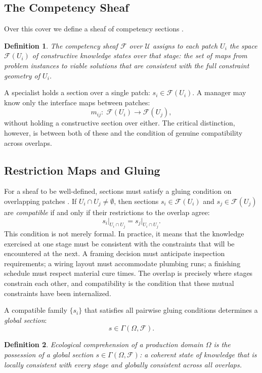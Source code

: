 \documentclass[12pt]{article}
\newtheorem{definition}{Definition}
\begin{document}
\subsection{The Competency Sheaf}

Over this cover we define a sheaf of competency sections \cite{Bredon1997,KashiwaraSchapira2006}.

\begin{definition}
The \emph{competency sheaf} $\mathcal{F}$ over $\mathcal{U}$ assigns to each patch $U_i$ the space $\mathcal{F}(U_i)$ of constructive knowledge states over that stage: the set of maps from problem instances to viable solutions that are consistent with the full constraint geometry of $U_i$.
\end{definition}

A specialist holds a section over a single patch: $s_i \in \mathcal{F}(U_i)$. A manager may know only the interface maps between patches:
\[
m_{ij}:\; \mathcal{F}(U_i) \longrightarrow \mathcal{F}(U_j),
\]
without holding a constructive section over either. The critical distinction, however, is between both of these and the condition of genuine compatibility across overlaps.

\subsection{Restriction Maps and Gluing}

For a sheaf to be well-defined, sections must satisfy a gluing condition on overlapping patches \cite{Godement1958,MacLane1998}. If $U_i \cap U_j \neq \emptyset$, then sections $s_i \in \mathcal{F}(U_i)$ and $s_j \in \mathcal{F}(U_j)$ are \emph{compatible} if and only if their restrictions to the overlap agree:
\[
s_i\big|_{U_i \cap U_j} = s_j\big|_{U_i \cap U_j}.
\]
This condition is not merely formal. In practice, it means that the knowledge exercised at one stage must be consistent with the constraints that will be encountered at the next. A framing decision must anticipate inspection requirements; a wiring layout must accommodate plumbing runs; a finishing schedule must respect material cure times. The overlap is precisely where stages constrain each other, and compatibility is the condition that these mutual constraints have been internalized.

A compatible family $\{s_i\}$ that satisfies all pairwise gluing conditions determines a \emph{global section}:
\[
s \in \Gamma(\Omega, \mathcal{F}).
\]

\begin{definition}
\emph{Ecological comprehension} of a production domain $\Omega$ is the possession of a global section $s \in \Gamma(\Omega, \mathcal{F})$: a coherent state of knowledge that is locally consistent with every stage and globally consistent across all overlaps.
\end{definition}
\end{document}
